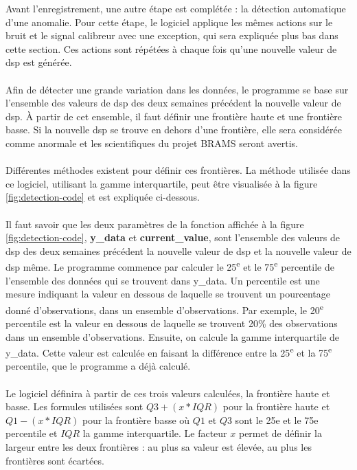 \documentclass[11pt]{article}
\begin{document}
Avant l'enregistrement, une autre étape est complétée : la détection automatique d'une anomalie.
Pour cette étape, le logiciel applique les mêmes actions sur le bruit et le signal calibreur avec une exception, qui sera expliquée plus bas dans cette section.
Ces actions sont répétées à chaque fois qu'une nouvelle valeur de dsp est générée.\\
\\
Afin de détecter une grande variation dans les données, le programme se base sur l'ensemble des valeurs de dsp des deux semaines précédent la nouvelle valeur de dsp.
À partir de cet ensemble, il faut définir une frontière haute et une frontière basse.
Si la nouvelle dsp se trouve en dehors d'une frontière, elle sera considérée comme anormale et les scientifiques du projet BRAMS seront avertis.\\
\\
Différentes méthodes existent pour définir ces frontières.
La méthode utilisée dans ce logiciel, utilisant la gamme interquartile, peut être visualisée à la figure \ref{fig:detection-code} et est expliquée ci-dessous.\\
\\
Il faut savoir que les deux paramètres de la fonction affichée à la figure \ref{fig:detection-code}, \textbf{y\_data} et \textbf{current\_value}, sont l'ensemble des valeurs de dsp des deux semaines précédent la nouvelle valeur de dsp et la nouvelle valeur de dsp même.
Le programme commence par calculer le 25\textsuperscript{e} et le 75\textsuperscript{e} percentile de l'ensemble des données qui se trouvent dans y\_data.
Un percentile est une mesure indiquant la valeur en dessous de laquelle se trouvent un pourcentage donné d'observations, dans un ensemble d'observations.
Par exemple, le 20\textsuperscript{e} percentile est la valeur en dessous de laquelle se trouvent 20\% des observations dans un ensemble d'observations.
Ensuite, on calcule la gamme interquartile de y\_data.
Cette valeur est calculée en faisant la différence entre la 25\textsuperscript{e} et la 75\textsuperscript{e} percentile, que le programme a déjà calculé.\\
\\
Le logiciel définira à partir de ces trois valeurs calculées, la frontière haute et basse.
Les formules utilisées sont \(Q3 + (x * IQR)\) pour la frontière haute et \(Q1 - (x * IQR)\) pour la frontière basse où \(Q1\) et \(Q3\) sont le 25e et le 75e percentile et \(IQR\) la gamme interquartile.
Le facteur \(x\) permet de définir la largeur entre les deux frontières : au plus sa valeur est élevée, au plus les frontières sont écartées.\\
\end{document}

